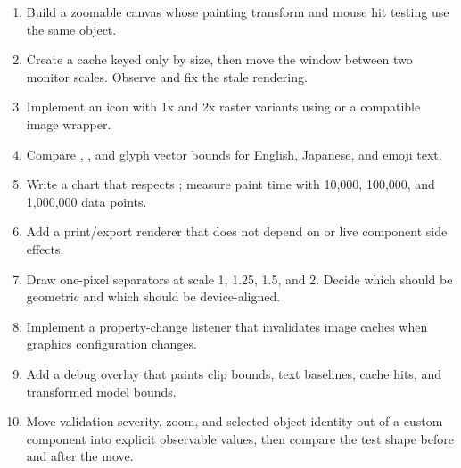 \begin{exercisebox}
\begin{enumerate}
\item Build a zoomable canvas whose painting transform and mouse hit testing use the same  object.
\item Create a cache keyed only by size, then move the window between two monitor scales. Observe and fix the stale rendering.
\item Implement an icon with 1x and 2x raster variants using  or a compatible image wrapper.
\item Compare , , and glyph vector bounds for English, Japanese, and emoji text.
\item Write a chart that respects ; measure paint time with 10,000, 100,000, and 1,000,000 data points.
\item Add a print/export renderer that does not depend on  or live component side effects.
\item Draw one-pixel separators at scale 1, 1.25, 1.5, and 2. Decide which should be geometric and which should be device-aligned.
\item Implement a property-change listener that invalidates image caches when graphics configuration changes.
\item Add a debug overlay that paints clip bounds, text baselines, cache hits, and transformed model bounds.
\item Move validation severity, zoom, and selected object identity out of a custom component into explicit observable values, then compare the test shape before and after the move.
\end{enumerate}
\end{exercisebox}

